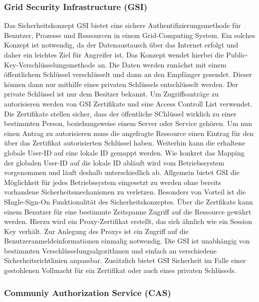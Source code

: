 \documentclass[utf8,biblatex]{lni}
\begin{document}
\subsubsection{Grid Security Infrastructure (GSI)}
 Das Sicherheitskonzept GSI bietet eine sichere Authentifizierungsmethode für Benutzer, Prozesse und Ressourcen in einem Grid-Computing System.
 Ein solches Konzept ist notwendig, da der Datenaustausch über das Internet erfolgt und daher ein leichtes Ziel für Angreifer ist. Das Konzept wendet hierbei die 
 Public-Key-Verschlüsselungsmethode an. Die Daten werden zunächst mit einem öffentlichem Schlüssel verschlüsselt und dann an den Empfänger gesendet. Dieser können dann nur mithilfe
 eines privaten Schlüssels entschlüsselt werden. Der private Schlüssel ist nur dem Besitzer bekannt. Um Zugriffsanträge zu autorisieren werden von GSI Zertifikate und 
 eine Access Controll List verwendet. Die Zertifikate stellen sicher, dass der öffentliche SChlüssel wirklich zu einer bestimmten Person, beziehungsweise einem Server oder Service gehören. 
 Um nun einen Antrag zu autorisieren muss die angefragte Ressource einen Eintrag für den über das Zertifikat autorisierten Schlüssel haben. Weiterhin kann die erhaltene globale User-ID auf 
 eine lokale ID gemappt werden. Wie konkret das Mapping der globalen User-ID auf die lokale ID abläuft wird vom Betriebssystem vorgenommen und läuft deshalb unterschiedlich ab.
 Allgemein bietet GSI die Möglichkeit für jedes Betriebssystem eingesetzt zu werden ohne bereits vorhandene Sicherheitsmechanismen zu verletzen. Besonders von Vorteil ist die 
 SIngle-Sign-On Funktionalität des Sicherheitskonzeptes. Über die Zertfikate kann einem Benutzer für eine bestimmte Zeitspanne Zugriff auf die Ressource gewährt werden. Hierzu wird ein Proxy-Zertifikat erstellt, das
 sich ähnlich wie ein Session Key verhält. Zur Anlegung des Proxys ist ein Zugriff auf die Benutzeranmeldeinformationen einmalig notwendig. Die GSI ist unabhängig von bestimmten Verschlüsselungsalgorithmen
 und einfach an verschiedene Sicherheitsrichtlinien anpassbar. Zusätzlich bietet GSI Sicherheit im Falle einer gestohlenen Vollmacht für ein Zertifikat oder auch eines privaten Schlüssels.

\subsubsection{Communiy Authorization Service (CAS)}
\end{document}
